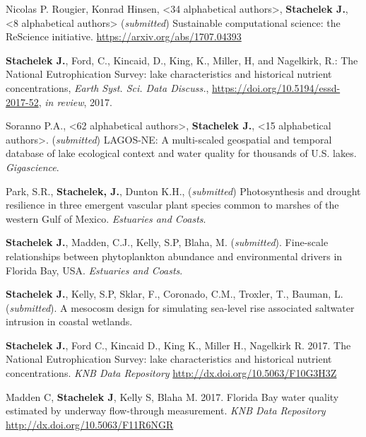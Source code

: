 \documentclass[10pt]{article}
\renewcommand{\section}[1]{\pagebreak[3]%
    \vspace{1.3\baselineskip}%
    \phantomsection\addcontentsline{toc}{section}{#1}%
    \noindent\llap{\scshape\smash{\parbox[t]{\marginparwidth}{\hyphenpenalty=10000\raggedright #1}}}%
    \vspace{-\baselineskip}\par}
\begin{document}
\begin{bibenum}

 \item Nicolas P. Rougier, Konrad Hinsen, <34 alphabetical authors>, \textbf{Stachelek J.}, <8 alphabetical authors> (\emph{submitted}) Sustainable computational science: the ReScience initiative. \href{arxiv.org/abs/1707.04393}{https://arxiv.org/abs/1707.04393}

  \item \textbf{Stachelek J.}, Ford, C., Kincaid, D., King, K., Miller, H, and Nagelkirk, R.: The National Eutrophication Survey: lake characteristics and historical nutrient concentrations, \emph{Earth Syst. Sci. Data Discuss.}, \url{https://doi.org/10.5194/essd-2017-52}, \emph{in review}, 2017.

    \item Soranno P.A., <62 alphabetical authors>, \textbf{Stachelek J.}, <15 alphabetical authors>. (\emph{submitted}) LAGOS-NE: A multi-scaled geospatial and temporal database of lake ecological context and water quality for thousands of U.S. lakes. \emph{Gigascience}.
  
    \item Park, S.R., \textbf{Stachelek, J.}, Dunton K.H., (\emph{submitted}) Photosynthesis and drought resilience in three emergent vascular plant species common to marshes of the western Gulf of Mexico. \emph{Estuaries and Coasts}.
   
    \item \textbf{Stachelek J.}, Madden, C.J., Kelly, S.P, Blaha, M. (\emph{submitted}). Fine-scale relationships between phytoplankton abundance and environmental drivers in Florida Bay, USA. \emph{Estuaries and Coasts}.
   
   \item \textbf{Stachelek J.}, Kelly, S.P, Sklar, F., Coronado, C.M., Troxler, T., Bauman, L. (\emph{submitted}). A mesocosm design for simulating sea-level rise associated saltwater intrusion in coastal wetlands.

\end{bibenum}

\section{Datasets}

\begin{bibenum}

\item \textbf{Stachelek J.}, Ford C., Kincaid D., King K., Miller H., Nagelkirk R. 2017. The National Eutrophication Survey: lake characteristics and historical nutrient concentrations. \emph{KNB Data Repository} \href{http://dx.doi.org/10.5063/F10G3H3Z}{http://dx.doi.org/10.5063/F10G3H3Z}

\item Madden C, \textbf{Stachelek J}, Kelly S, Blaha M. 2017. Florida Bay water quality estimated by underway flow-through measurement. \emph{KNB Data Repository} \\ \href{http://dx.doi.org/10.5063/F11R6NGR}{http://dx.doi.org/10.5063/F11R6NGR}
   
\end{bibenum}
\end{document}
